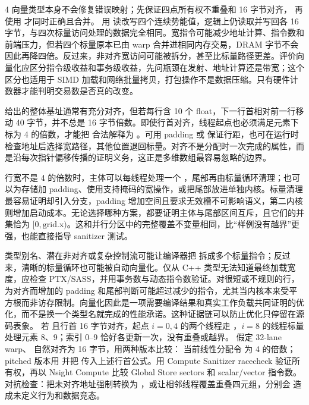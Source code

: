 \begin{solutionexercise}{4}
\conclusionheading 向量类型本身不会修复错误映射；先保证四点所有权不重叠和 16 字节对齐，
再使用  才同时正确且合并。
\discussionheading
{}
用  读改写四个连续势能值，逻辑上仍读取并写回各 16 字节，与四次标量访问处理的数据完全相同。宽指令可能减少地址计算、指令数和前端压力，但若四个标量原本已由 warp 合并进相同内存交易，DRAM 字节不会因此再降四倍。反过来，非对齐宽访问可能被拆分，甚至比标量路径更差。评价向量化应区分指令级收益和事务级收益，先问瓶颈在发射、地址计算还是带宽；这个区分也适用于 SIMD 加载和网络批量拷贝，打包操作不是数据压缩。只有硬件计数器才能判明交易数是否真的改变。

 给出的整体基址通常有充分对齐，但若每行含 10 个 float，下一行首相对前一行移动 40 字节，并不总是 16 字节倍数。即使行首对齐，线程起点也必须满足元素下标为 4 的倍数，才能把  合法解释为 。可用 padding 或  保证行距，也可在运行时检查地址后选择宽路径，其他位置退回标量。对齐不是分配时一次完成的属性，而是沿每次指针偏移传播的证明义务，这正是多维数组最容易忽略的边界。

行宽不是 4 的倍数时，主体可以每线程处理一个 ，尾部再由标量循环清理；也可以为存储加 padding、使用支持掩码的宽操作，或把尾部放进单独内核。标量清理最容易证明却引入分支，padding 增加空间且要求无效槽不可影响语义，第二内核则增加启动成本。无论选择哪种方案，都要证明主体与尾部区间互斥，且它们的并集恰为 $[0,\mathrm{grid.x})$。这和并行分区中的完整覆盖不变量相同，比“样例没有越界”更强，也能直接指导 sanitizer 测试。

类型别名、潜在非对齐或复杂控制流可能让编译器把  拆成多个标量指令；反过来，清晰的标量循环也可能被自动向量化。仅从 C++ 类型无法知道最终加载宽度，应检查 PTX/SASS，并用事务数与动态指令数验证。对很短或不规则的行，为对齐而增加的 padding 和尾部判断可能超过减少的指令，尤其当内核本来受平方根而非访存限制。向量化因此是一项需要编译结果和真实工作负载共同证明的优化，而不是换一个类型名就完成的性能承诺。这种证据链可以防止优化只停留在源码表象。
\variantheading 若  且行首 16 字节对齐，起点 $i=0,4$ 的两个线程走 ，$i=8$ 的线程标量处理元素 8、9；索引 0--9 恰好各更新一次，没有重叠或越界。
\practiceheading 假定 32-lane warp、 自然对齐为 16 字节，用两种版本比较：
当前线性分配令  为 4 的倍数；pitched 版本用  并把
 传入上述行首公式。用 Compute Sanitizer racecheck 验证所有权，再以
Nsight Compute 比较 Global Store sectors 和 scalar/vector 指令数。
对抗检查：把未对齐地址强制转换为 ，或让相邻线程覆盖重叠四元组，分别会
造成未定义行为和数据竞态。
\end{solutionexercise}

